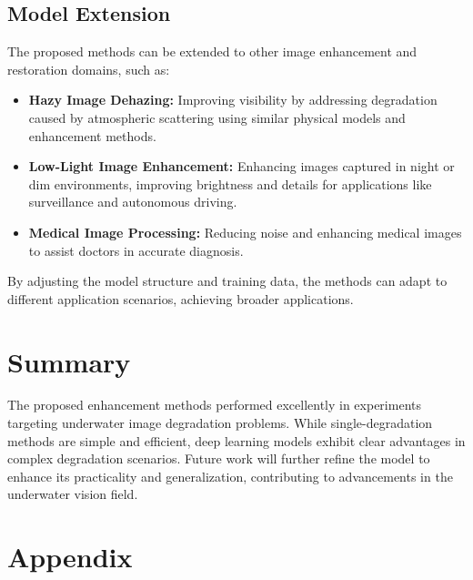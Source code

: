 \documentclass{apmcmthesis}
\begin{document}
\subsection{Model Extension}
The proposed methods can be extended to other image enhancement and restoration domains, such as:
\begin{itemize}
    \item \textbf{Hazy Image Dehazing:} Improving visibility by addressing degradation caused by atmospheric scattering using similar physical models and enhancement methods.
    \item \textbf{Low-Light Image Enhancement:} Enhancing images captured in night or dim environments, improving brightness and details for applications like surveillance and autonomous driving.
    \item \textbf{Medical Image Processing:} Reducing noise and enhancing medical images to assist doctors in accurate diagnosis.
\end{itemize}
By adjusting the model structure and training data, the methods can adapt to different application scenarios, achieving broader applications.

\section{Summary}
The proposed enhancement methods performed excellently in experiments targeting underwater image degradation problems. While single-degradation methods are simple and efficient, deep learning models exhibit clear advantages in complex degradation scenarios. Future work will further refine the model to enhance its practicality and generalization, contributing to advancements in the underwater vision field.


\newpage

\section{Appendix}
\end{document}
